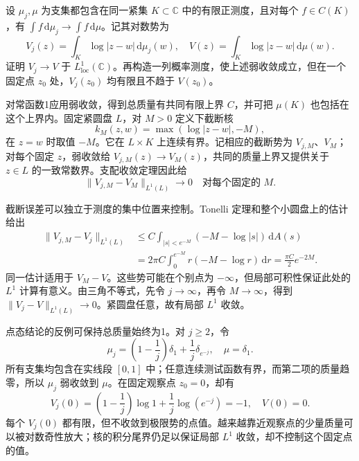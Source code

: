 \begin{exercise}[测度弱收敛与对数势的两种收敛]\label{b3:ex:15-draft-08}
设 \(\mu_j,\mu\) 为支集都包含在同一紧集 \(K\subset\mathbb C\) 中的有限正测度，且对每个 \(f\in C(K)\)，有 \(\int f\,\mathrm d\mu_j\to\int f\,\mathrm d\mu\)。记其对数势为
\[
 V_j(z)=\int_K\log|z-w|\,\mathrm d\mu_j(w),\quad
 V(z)=\int_K\log|z-w|\,\mathrm d\mu(w).
\]
证明 \(V_j\to V\) 于 \(L^1_{\mathrm{loc}}(\mathbb C)\)。再构造一列概率测度，使上述弱收敛成立，但在一个固定点 \(z_0\) 处，\(V_j(z_0)\) 均有限且不趋于 \(V(z_0)\)。
\end{exercise}
\begin{solution}
对常函数1应用弱收敛，得到总质量有共同有限上界 \(C\)，并可把 \(\mu(K)\) 也包括在这个上界内。固定紧圆盘 \(L\)，对 \(M>0\) 定义下截断核
\[
 k_M(z,w)=\max(\log|z-w|,-M),
\]
在 \(z=w\) 时取值 \(-M\)。它在 \(L\times K\) 上连续有界。记相应的截断势为 \(V_{j,M}\)、\(V_M\)；对每个固定 \(z\)，弱收敛给 \(V_{j,M}(z)\to V_M(z)\)，共同的质量上界又提供关于 \(z\in L\) 的一致常数界。支配收敛定理因此给
\[
 \|V_{j,M}-V_M\|_{L^1(L)}\longrightarrow0
 \quad\text{对每个固定的 }M.
\]

截断误差可以独立于测度的集中位置来控制。Tonelli 定理和整个小圆盘上的估计给出
\begin{align*}
 \|V_{j,M}-V_j\|_{L^1(L)}
 &\le C\int_{|s|<e^{-M}}(-M-\log|s|)\,\mathrm dA(s)\\
 &=2\pi C\int_0^{e^{-M}}r(-M-\log r)\,\mathrm dr
 =\frac{\pi C}{2}e^{-2M}.
\end{align*}
同一估计适用于 \(V_M-V\)。这些势可能在个别点为 \(-\infty\)，但局部可积性保证此处的 \(L^1\) 计算有意义。由三角不等式，先令 \(j\to\infty\)，再令 \(M\to\infty\)，得到 \(\|V_j-V\|_{L^1(L)}\to0\)。紧圆盘任意，故有局部 \(L^1\) 收敛。

点态结论的反例可保持总质量始终为1。对 \(j\ge2\)，令
\[
 \mu_j=\left(1-\frac1j\right)\delta_1
              +\frac1j\delta_{e^{-j}},\quad \mu=\delta_1.
\]
所有支集均包含在实线段 \([0,1]\) 中；任意连续测试函数有界，而第二项的质量趋零，所以 \(\mu_j\) 弱收敛到 \(\mu\)。在固定观察点 \(z_0=0\)，却有
\[
 V_j(0)=\left(1-\frac1j\right)\log1
                  +\frac1j\log(e^{-j})=-1,\quad V(0)=0.
\]
每个 \(V_j(0)\) 都有限，但不收敛到极限势的点值。越来越靠近观察点的少量质量可以被对数奇性放大；核的积分尾界仍足以保证局部 \(L^1\) 收敛，却不控制这个固定点的值。
\end{solution}
